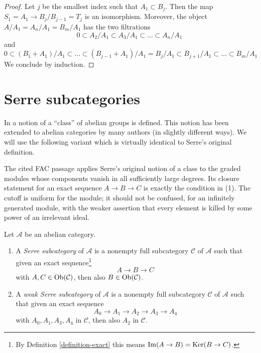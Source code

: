 \begin{proof}
Let $j$ be the smallest index such that $A_1 \subset B_j$.
Then the map $S_1 = A_1 \to B_j/B_{j - 1} = T_j$ is an isomorphism.
Moreover, the object $A/A_1 = A_n/A_1 = B_m/A_1$
has the two filtrations
$$
0 \subset A_2/A_1 \subset A_3/A_1 \subset \ldots \subset A_n/A_1
$$
and
$$
0 \subset (B_1 + A_1)/A_1 \subset \ldots \subset
(B_{j - 1} + A_1)/A_1 = B_j/A_1 \subset B_{j + 1}/A_1
\subset \ldots \subset B_m/A_1
$$
We conclude by induction.
\end{proof}








\section{Serre subcategories}
\label{section-serre-subcategories}

\noindent
In \cite[Chapter I, Section 1]{Serre_homotopie_classes}
a notion of a ``class'' of abelian groups is defined.
This notion has been extended to abelian categories by many authors
(in slightly different ways). We will use the following variant
which is virtually identical to Serre's original definition.

\begin{definition}
\label{definition-serre-subcategory}
\begin{reference}
\cite[Condition (I) on page 259]{Serre_homotopie_classes}
\cite[Chapter III, \S 2, no. 56, p. 249]{FAC}
\end{reference}
\begin{history}
The cited FAC passage applies Serre's original notion of a class to the
graded modules whose components vanish in all sufficiently large degrees.
Its closure statement for an exact sequence $A \to B \to C$ is exactly the
condition in (1). The cutoff is uniform for the module; it should not be
confused, for an infinitely generated module, with the weaker assertion
that every element is killed by some power of an irrelevant ideal.
\end{history}
Let $\mathcal{A}$ be an abelian category.
\begin{enumerate}
\item A {\it Serre subcategory} of $\mathcal{A}$ is a
nonempty full subcategory $\mathcal{C}$ of $\mathcal{A}$
such that given an exact sequence\footnote{By
Definition \ref{definition-exact} this means $\mathop{\mathrm{Im}}(A \to B) = \mathop{\mathrm{Ker}}(B \to C)$.}
$$
A \to B \to C
$$
with $A, C \in \mathop{\mathrm{Ob}}\nolimits(\mathcal{C})$, then also
$B \in \mathop{\mathrm{Ob}}\nolimits(\mathcal{C})$.
\item A {\it weak Serre subcategory} of $\mathcal{A}$ is a nonempty
full subcategory $\mathcal{C}$ of $\mathcal{A}$ such that given an
exact sequence
$$
A_0 \to A_1 \to A_2 \to A_3 \to A_4
$$
with $A_0, A_1, A_3, A_4$ in $\mathcal{C}$, then also $A_2$ in $\mathcal{C}$.
\end{enumerate}
\end{definition}

